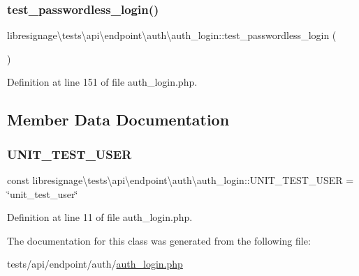 \subsubsection{\texorpdfstring{test\+\_\+passwordless\+\_\+login()}{test\_passwordless\_login()}}
{\footnotesize\ttfamily libresignage\textbackslash{}tests\textbackslash{}api\textbackslash{}endpoint\textbackslash{}auth\textbackslash{}auth\+\_\+login\+::test\+\_\+passwordless\+\_\+login (\begin{DoxyParamCaption}{ }\end{DoxyParamCaption})}



Definition at line 151 of file auth\+\_\+login.\+php.



\subsection{Member Data Documentation}
\mbox{\label{classlibresignage_1_1tests_1_1api_1_1endpoint_1_1auth_1_1auth__login_a84cb333fed51a6addc5b8bb47f21f627}} 
\subsubsection{\texorpdfstring{U\+N\+I\+T\+\_\+\+T\+E\+S\+T\+\_\+\+U\+S\+ER}{UNIT\_TEST\_USER}}
{\footnotesize\ttfamily const libresignage\textbackslash{}tests\textbackslash{}api\textbackslash{}endpoint\textbackslash{}auth\textbackslash{}auth\+\_\+login\+::\+U\+N\+I\+T\+\_\+\+T\+E\+S\+T\+\_\+\+U\+S\+ER = \char`\"{}unit\+\_\+test\+\_\+user\char`\"{}}



Definition at line 11 of file auth\+\_\+login.\+php.



The documentation for this class was generated from the following file\+:\begin{DoxyCompactItemize}
\item 
tests/api/endpoint/auth/\hyperlink{tests_2api_2endpoint_2auth_2auth__login_8php}{auth\+\_\+login.\+php}\end{DoxyCompactItemize}
